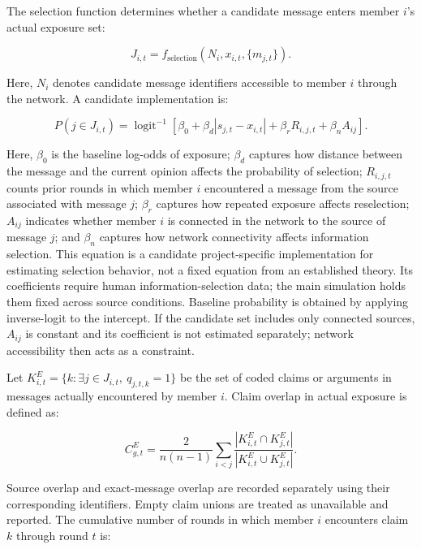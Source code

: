 \documentclass[11pt,a4paper]{article}
\begin{document}
The selection function determines whether a candidate message enters member $i$'s actual exposure set:

\begin{equation*}
J_{i,t}
=
f_{\text{selection}}
(N_i,x_{i,t},\{m_{j,t}\}).
\end{equation*}

Here, $N_i$ denotes candidate message identifiers accessible to member $i$ through the network. A candidate implementation is:

\begin{equation*}
P(j\in J_{i,t})
=
\operatorname{logit}^{-1}
\left[
\beta_0
+
\beta_d|s_{j,t}-x_{i,t}|
+
\beta_rR_{i,j,t}
+
\beta_nA_{ij}
\right].
\end{equation*}

Here, $\beta_0$ is the baseline log-odds of exposure; $\beta_d$ captures how distance between the message and the current opinion affects the probability of selection; $R_{i,j,t}$ counts prior rounds in which member $i$ encountered a message from the source associated with message $j$; $\beta_r$ captures how repeated exposure affects reselection; $A_{ij}$ indicates whether member $i$ is connected in the network to the source of message $j$; and $\beta_n$ captures how network connectivity affects information selection. This equation is a candidate project-specific implementation for estimating selection behavior, not a fixed equation from an established theory. Its coefficients require human information-selection data; the main simulation holds them fixed across source conditions. Baseline probability is obtained by applying inverse-logit to the intercept. If the candidate set includes only connected sources, $A_{ij}$ is constant and its coefficient is not estimated separately; network accessibility then acts as a constraint.

Let $K^{E}_{i,t}=\{k:\exists j\in J_{i,t},\ q_{j,t,k}=1\}$ be the set of coded claims or arguments in messages actually encountered by member $i$. Claim overlap in actual exposure is defined as:

\begin{equation*}
C^{E}_{g,t}
=
\frac{2}{n(n-1)}
\sum_{i<j}
\frac{|K^{E}_{i,t}\cap K^{E}_{j,t}|}
{|K^{E}_{i,t}\cup K^{E}_{j,t}|}.
\end{equation*}

Source overlap and exact-message overlap are recorded separately using their corresponding identifiers. Empty claim unions are treated as unavailable and reported. The cumulative number of rounds in which member $i$ encounters claim $k$ through round $t$ is:
\end{document}
